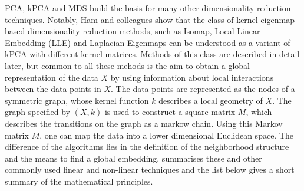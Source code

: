 PCA, kPCA and MDS build the basis for many other dimensionality reduction techniques. Notably, Ham and colleagues show that the class of kernel-eigenmap-based dimensionality reduction methods, such as Isomap, Local Linear Embedding (LLE) and Laplacian Eigenmaps can be understood as a variant of kPCA with different kernel matrices. Methods of this class are described in detail later, but common to all these mehods is the aim to obtain a global representation of the data \(X\) by using information about local interactions between the data points in \(X\). The data points are represented as the nodes of a symmetric graph, whose kernel function \(k\) describes a local geometry of \(X\). The graph specified by \((X, k)\) is used to construct a square matrix \(M\), which describes the transitions on the graph as a markow chain. Using this Markov matrix \(M\), one can map the data into a lower dimensional Euclidean space. The difference of the algorithms lies in the definition of the neighborhood structure and the means to find a global embedding.  summarises these and other commonly used linear and non-linear techniques and the list below gives a short summary of the mathematical principles. 


